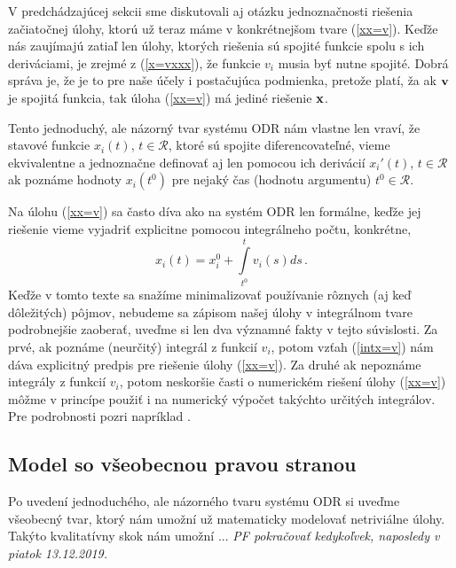 V predchádzajúcej sekcii sme diskutovali aj otázku jednoznačnosti riešenia začiatočnej úlohy, ktorú už teraz máme v konkrétnejšom tvare (\ref{xx=v}). Keďže nás zaujímajú zatiaľ len úlohy, ktorých riešenia sú spojité funkcie spolu s ich deriváciami, je zrejmé z (\ref{x=vxxx}), že funkcie $v_i$ musia byť nutne spojité. Dobrá správa je, že je to pre naše účely i postačujúca podmienka, pretože platí, ža ak $\bf v$ je spojitá funkcia, tak úloha (\ref{xx=v}) má jediné riešenie $\bf x$.

Tento jednoduchý, ale názorný tvar systému ODR nám vlastne len vraví, že stavové funkcie $x_i(t)$, $t \in \mathcal{R}$, ktoré sú spojite diferencovateľné, vieme ekvivalentne a jednoznačne definovať aj len pomocou ich derivácií $x_i'(t)$, $t \in \mathcal{R}$ ak poznáme hodnoty $x_i(t^0)$ pre nejaký čas (hodnotu argumentu) $t^0 \in \mathcal{R}$.

\begin{pz}
Na úlohu (\ref{xx=v}) sa často díva ako na systém ODR len formálne, keďže jej riešenie vieme vyjadriť explicitne pomocou integrálneho počtu, konkrétne,
\begin{equation}
\label{intx=v}
x_i(t) = x_i^0 + \int \limits_{t^0}^{t} v_i(s) ds \,.
\end{equation}
Keďže v tomto texte sa snažíme minimalizovať používanie rôznych (aj keď dôležitých) pôjmov, nebudeme sa zápisom našej úlohy v integrálnom tvare podrobnejšie zaoberať, uveďme si len dva významné fakty v tejto súvislosti. Za prvé, ak poznáme (neurčitý) integrál z funkcií $v_i$, potom vzťah (\ref{intx=v}) nám dáva explicitný predpis pre riešenie úlohy (\ref{xx=v}). Za druhé ak nepoznáme integrály z funkcií $v_i$, potom neskoršie časti o numerickém riešení úlohy (\ref{xx=v}) môžme v princípe použiť i na numerický výpočet takýchto určitých integrálov. Pre podrobnosti pozri napríklad \cite{X}.
\end{pz} 

\subsection{Model so všeobecnou pravou stranou}

Po uvedení jednoduchého, ale názorného tvaru systému ODR si uveďme všeobecný tvar, ktorý nám umožní už matematicky modelovať netriviálne úlohy. Takýto kvalitatívny skok nám umožní ...
{\it PF pokračovať kedykoľvek, naposledy v piatok 13.12.2019.}